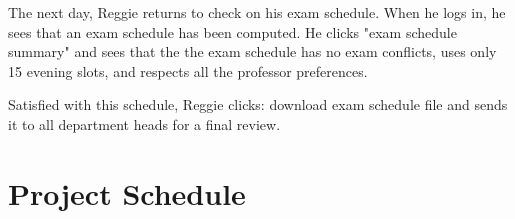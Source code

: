 \documentclass[11pt]{article}
\begin{document}
\begin{description}
The next day, Reggie returns to check on his exam schedule. When he logs in, he sees
that an exam schedule has been computed. He clicks "exam schedule summary" and sees that
the the exam schedule has no exam conflicts, uses only 15 evening slots, and respects all
the professor preferences. 

Satisfied with this schedule, Reggie clicks: download exam schedule file and sends it to all
department heads for a final review.


\end{description}

\section{Project Schedule} %
\end{document}
